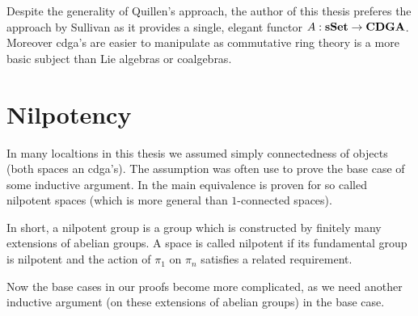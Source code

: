 Despite the generality of Quillen's approach, the author of this thesis  preferes the approach by Sullivan as it provides a single, elegant functor $A: \mathbf{s{\mathbf{Set}}} \to \mathbf{CDGA}$. Moreover cdga's are easier to manipulate as commutative ring theory is a more basic subject than Lie algebras or coalgebras.


\section{Nilpotency}
In many localtions in this thesis we assumed simply connectedness of objects (both spaces an cdga's). The assumption was often use to prove the base case of some inductive argument. In \cite{bousfield} the main equivalence is proven for so called nilpotent spaces (which is more general than $1$-connected spaces).

In short, a nilpotent group is a group which is constructed by finitely many extensions of abelian groups. A space is called nilpotent if its fundamental group is nilpotent and the action of $\pi_1$ on $\pi_n$ satisfies a related requirement.

Now the base cases in our proofs become more complicated, as we need another inductive argument (on these extensions of abelian groups) in the base case.

